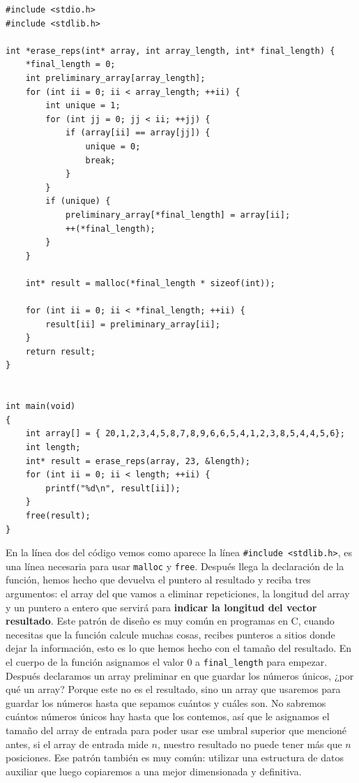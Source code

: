 \documentclass[a4paper]{article}
\begin{document}
\noindent
\begin{minipage}[H]{\linewidth}
\mbox{}
\begin{lstlisting}[style=C, label={lst:mallocAndFree}, caption={Ejemplo de reserva dinámica}]
#include <stdio.h>
#include <stdlib.h>

int *erase_reps(int* array, int array_length, int* final_length) {
    *final_length = 0;
    int preliminary_array[array_length];
    for (int ii = 0; ii < array_length; ++ii) {
        int unique = 1;
        for (int jj = 0; jj < ii; ++jj) {
            if (array[ii] == array[jj]) {
                unique = 0;
                break;
            }
        }
        if (unique) {
            preliminary_array[*final_length] = array[ii];
            ++(*final_length);
        }
    }

    int* result = malloc(*final_length * sizeof(int));

    for (int ii = 0; ii < *final_length; ++ii) {
        result[ii] = preliminary_array[ii];
    }
    return result;
}


int main(void)
{
    int array[] = { 20,1,2,3,4,5,8,7,8,9,6,6,5,4,1,2,3,8,5,4,4,5,6};
    int length;
    int* result = erase_reps(array, 23, &length);
    for (int ii = 0; ii < length; ++ii) {
        printf("%d\n", result[ii]);
    }
    free(result);
}
\end{lstlisting}
\end{minipage}

En la línea dos del código vemos como aparece la línea
\verb!#include <stdlib.h>!, es una línea necesaria para usar \verb!malloc! y
\verb!free!. Después llega la declaración de la función, hemos hecho que
devuelva el puntero al resultado y reciba tres argumentos: el array del que
vamos a eliminar repeticiones, la longitud del array y un puntero a entero que
servirá para \textbf{indicar la longitud del vector resultado}. Este patrón
de diseño es muy común en programas en C, cuando necesitas que la función
calcule muchas cosas, recibes punteros a sitios donde dejar la información,
esto es lo que hemos hecho con el tamaño del resultado. En el cuerpo
de la función asignamos el valor 0 a \verb!final_length! para empezar. Después
declaramos un array preliminar en que guardar los números únicos, ¿por qué un
array? Porque este no es el resultado, sino un array que usaremos para guardar
los números hasta que sepamos cuántos y cuáles son. No sabremos cuántos
números únicos hay hasta que los contemos, así que le asignamos el tamaño del
array de entrada para poder usar ese umbral superior que mencioné antes, si
el array de entrada mide $n$, nuestro resultado no puede tener más que $n$
posiciones.
Ese patrón también es muy común: utilizar una estructura de datos auxiliar que
luego copiaremos a una mejor dimensionada y definitiva.
\end{document}
